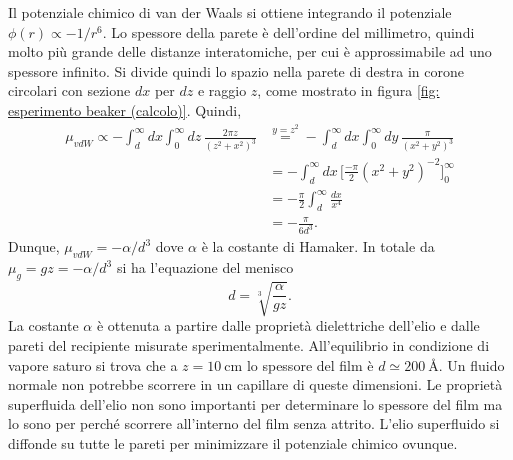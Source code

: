 Il potenziale chimico di van der Waals si ottiene integrando il potenziale $\phi(r) \propto -1/r^6$. Lo spessore della parete è dell'ordine del millimetro, quindi molto più grande delle distanze interatomiche, per cui è approssimabile ad uno spessore infinito. Si divide quindi lo spazio nella parete di destra in corone circolari con sezione $dx$ per $dz$ e raggio $z$, come mostrato in figura \ref{fig: esperimento beaker (calcolo)}. Quindi, 
\begin{equation}
    \begin{split}
        \mu_{vdW} \propto -\int_d^\infty dx\int _0^\infty dz\, \frac{2\pi z}{(z^2 + x^2)^3} &\overset{y=z^2}{=} -\int_d^\infty dx \int _0^\infty dy\,\frac{\pi}{(x^2 + y^2)^3} \\
        &= -\int_d^\infty dx\,\bigg[\frac{-\pi}{2}(x^2 + y^2)^{-2}\bigg]_0^\infty \\
        &= -\frac{\pi}{2}\int_d^\infty \frac{dx}{x^4} \\
        &= -\frac{\pi}{6d^3}.
    \end{split}
\end{equation}
Dunque, $\mu_{vdW} = -\alpha/d^3$ dove $\alpha$ è la costante di Hamaker. In totale da $\mu_g = gz = -\alpha/d^3$ si ha l'equazione del menisco
\begin{equation}
\label{eq: equazione del menisco}
    d = \sqrt[3]{\frac{\alpha}{gz}}.
\end{equation}
La costante $\alpha$ è ottenuta a partire dalle proprietà dielettriche dell'elio e dalle pareti del recipiente misurate sperimentalmente. All'equilibrio in condizione di vapore saturo si trova che a $z = \SI{10}{\centi\meter}$ lo spessore del film è $d \simeq \SI{200}{\angstrom}$. Un fluido normale non potrebbe scorrere in un capillare di queste dimensioni. Le proprietà superfluida dell'elio non sono importanti per determinare lo spessore del film ma lo sono per perché scorrere all'interno del film senza attrito. L'elio superfluido si diffonde su tutte le pareti per minimizzare il potenziale chimico ovunque. 

